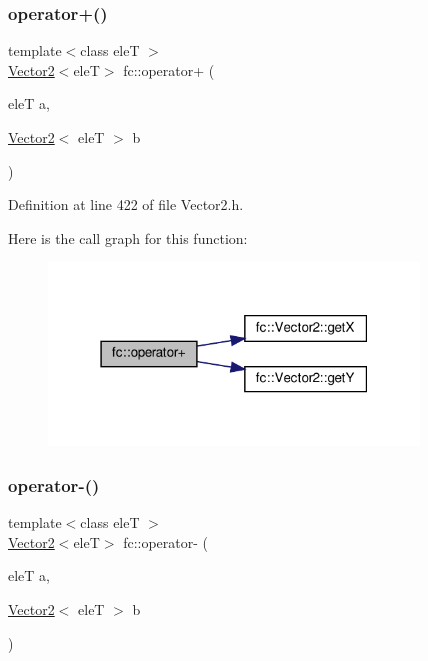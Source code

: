 \subsubsection{\texorpdfstring{operator+()}{operator+()}}
{\footnotesize\ttfamily template$<$class eleT $>$ \\
\hyperlink{classfc_1_1Vector2}{Vector2}$<$eleT$>$ fc\+::operator+ (\begin{DoxyParamCaption}\item[{eleT}]{a,  }\item[{\hyperlink{classfc_1_1Vector2}{Vector2}$<$ eleT $>$}]{b }\end{DoxyParamCaption})}



Definition at line 422 of file Vector2.\+h.

Here is the call graph for this function\+:
\nopagebreak
\begin{figure}[H]
\begin{center}
\leavevmode
\includegraphics[width=279pt]{d2/db4/namespacefc_a54dd7df4c8a01e800426c7aefe3b349b_cgraph}
\end{center}
\end{figure}
\mbox{\label{namespacefc_a851bc28427c29f20a4433485c0ae7afd}} 
\subsubsection{\texorpdfstring{operator-\/()}{operator-()}}
{\footnotesize\ttfamily template$<$class eleT $>$ \\
\hyperlink{classfc_1_1Vector2}{Vector2}$<$eleT$>$ fc\+::operator-\/ (\begin{DoxyParamCaption}\item[{eleT}]{a,  }\item[{\hyperlink{classfc_1_1Vector2}{Vector2}$<$ eleT $>$}]{b }\end{DoxyParamCaption})}



